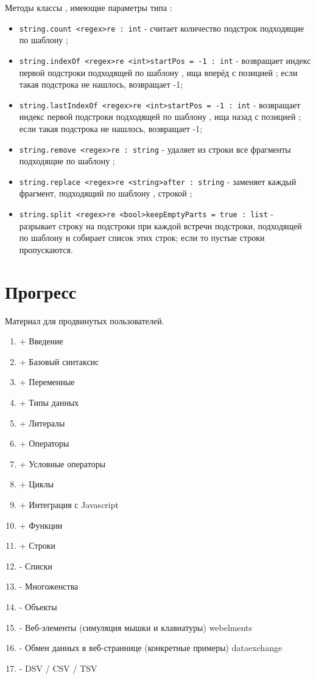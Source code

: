 \documentclass[a4paper, 14pt]{extarticle}
\newenvironment{icItems}
	{ \begin{itemize} [noitemsep,nolistsep] }
	{ \end{itemize} }
\newenvironment{icEnum}
	{ \begin{enumerate}[noitemsep,nolistsep] }
	{ \end{enumerate} }
\begin{document}
Методы классы \str, имеющие параметры типа \regex:
\begin{icItems}
\item
	\lstinline|string.count <regex>re : int| - считает количество подстрок подходящие по шаблону ;
\item
	\lstinline|string.indexOf <regex>re <int>startPos = -1 : int| - возвращает индекс первой подстроки подходящей по шаблону , ища вперёд с позицией ; если такая подстрока не нашлось, возвращает -1;
\item
	\lstinline|string.lastIndexOf <regex>re <int>startPos = -1 : int| - возвращает индекс первой подстроки подходящей по шаблону , ища назад с позицией ; если такая подстрока не нашлось, возвращает -1;
\item
	\lstinline|string.remove <regex>re : string| - удаляет из строки все фрагменты подходящие по шаблону ;
\item 
	\lstinline|string.replace <regex>re <string>after : string| - заменяет каждый фрагмент, подходящий по шаблону , строкой ;
\item
	\lstinline|string.split <regex>re <bool>keepEmptyParts = true : list| - разрывает строку на подстроки при каждой встречи подстроки, подходящей по шаблону  и собирает список этих строк; если  то пустые строки пропускаются.
\end{icItems}

\newpage
\section{Прогресс}

{\color{red}Материал для продвинутых пользователей.}

\begin{icEnum}
	\item + Введение
	\item + Базовый синтаксис
	\item + Переменные
	\item + Типы данных
	\item + Литералы
	\item + Операторы
	\item + Условные операторы
	\item + Циклы
	\item + Интеграция с Javascript
	\item + Функции
	\item + Строки
	\item - Списки
	\item - Многоженства
	\item - Объекты
	\item - Веб-элементы (симуляция мышки и клавиатуры) webelments
	\item - Обмен данных в веб-страннице (конкретные примеры) dataexchange
	\item - DSV / CSV / TSV
\end{icEnum}
\end{document}
